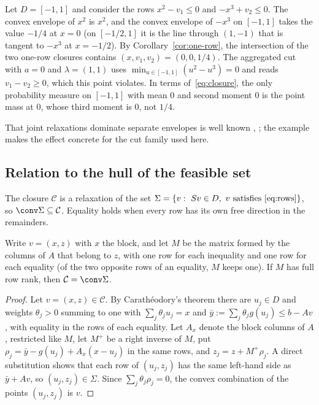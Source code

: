 \begin{example}\label{ex:two-rows}
Let $D=[-1,1]$ and consider the rows $x^2-v_1\le0$ and $-x^3+v_2\le0$. The
convex envelope of $x^2$ is $x^2$, and the convex envelope of $-x^3$ on
$[-1,1]$ takes the value $-1/4$ at $x=0$ (on $[-1/2,1]$ it is the line through
$(1,-1)$ that is tangent to $-x^3$ at $x=-1/2$). By
Corollary~\ref{cor:one-row}, the intersection of the two one-row closures
contains $(x,v_1,v_2)=(0,0,1/4)$. The aggregated cut with $a=0$ and
$\lambda=(1,1)$ uses $\min_{u\in[-1,1]}(u^2-u^3)=0$ and reads $v_1-v_2\ge0$,
which this point violates. In terms of~\eqref{eq:closure}, the only
probability measure on $[-1,1]$ with mean $0$ and second moment $0$ is the
point mass at $0$, whose third moment is $0$, not $1/4$.
\end{example}

That joint relaxations dominate separate envelopes is well known
\citep[Lemma~3.4]{Nowak2005}, \citep{Tawarmalani2010,LiersEtAl2021}; the
example makes the effect concrete for the cut family used here.

\subsection{Relation to the hull of the feasible set}\label{sec:feasible-hull}

The closure $\mathcal C$ is a relaxation of the set
$\Sigma=\{v:\ Sv\in D,\ v\text{ satisfies~\eqref{eq:rows}}\}$, so
$\conv\Sigma\subseteq\mathcal C$. Equality holds when every row has its own
free direction in the remainders.

\begin{proposition}\label{prop:free-remainders}
Write $v=(x,z)$ with $x$ the block, and let $M$ be the matrix formed by the
columns of $A$ that belong to $z$, with one row for each inequality and one
row for each equality (of the two opposite rows of an equality, $M$ keeps one).
If $M$ has full row rank, then $\mathcal C=\conv\Sigma$.
\end{proposition}

\begin{proof}
Let $v=(x,z)\in\mathcal C$. By Carath\'eodory's theorem there are $u_j\in D$ and
weights $\theta_j>0$ summing to one with $\sum_j\theta_ju_j=x$ and
$\bar y:=\sum_j\theta_jg(u_j)\le b-Av$, with equality in the rows of each
equality. Let $A_x$ denote the block columns of $A$, restricted like $M$, let
$M^+$ be a right inverse of $M$, put $\rho_j=\bar y-g(u_j)+A_x(x-u_j)$ in the
same rows, and $z_j=z+M^+\rho_j$. A direct substitution shows that each row
of $(u_j,z_j)$ has the same left-hand side as $\bar y+Av$, so
$(u_j,z_j)\in\Sigma$. Since $\sum_j\theta_j\rho_j=0$, the convex combination of
the points $(u_j,z_j)$ is $v$.
\end{proof}

